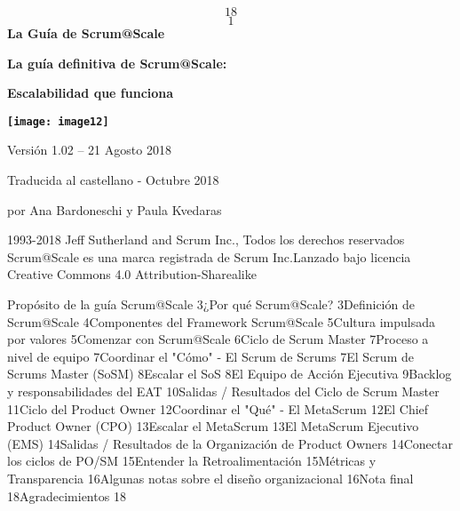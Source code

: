\documentclass{article} %
\begin{document}


\noindent 

\noindent 

\noindent 

\noindent 

\noindent 
\[18\] 
\[1\] 
\textbf{La Gu\'{i}a de Scrum@Scale{\circledR}}

\noindent \textbf{La gu\'{i}a definitiva de Scrum@Scale:}

\noindent \textbf{Escalabilidad que funciona}

\noindent \textbf{\texttt{[image: image12]}}

\noindent \textbf{}

\noindent Versi\'{o}n 1.02 -- 21 Agosto 2018

\noindent Traducida al castellano - Octubre 2018 

\noindent por Ana Bardoneschi y Paula Kvedaras

\noindent \textbf{}

\noindent {\copyright}1993-2018 Jeff Sutherland and Scrum Inc., Todos los derechos reservados Scrum@Scale es una marca registrada de Scrum Inc.Lanzado bajo licencia Creative Commons 4.0 Attribution-Sharealike

\noindent \eject 

\noindent 

\noindent Prop\'{o}sito de la gu\'{i}a Scrum@Scale 3¿Por qu\'{e} Scrum@Scale? 3Definici\'{o}n de Scrum@Scale 4Componentes del Framework Scrum@Scale{\circledR} 5Cultura impulsada por valores 5Comenzar con Scrum@Scale 6Ciclo de Scrum Master 7Proceso a nivel de equipo 7Coordinar el "C\'{o}mo" - El Scrum de Scrums 7El Scrum de Scrums Master (SoSM) 8Escalar el SoS 8El Equipo de Acci\'{o}n Ejecutiva 9Backlog y responsabilidades del EAT 10Salidas / Resultados del Ciclo de Scrum Master 11Ciclo del Product Owner 12Coordinar el "Qu\'{e}" -  El MetaScrum 12El Chief Product Owner (CPO) 13Escalar el MetaScrum 13El MetaScrum Ejecutivo (EMS) 14Salidas / Resultados de la Organizaci\'{o}n de Product Owners 14Conectar los ciclos de PO/SM 15Entender la Retroalimentaci\'{o}n 15M\'{e}tricas y Transparencia 16Algunas notas sobre el dise\~{n}o organizacional 16Nota final 18Agradecimientos 18

\noindent \textbf{}

\noindent \textbf{}

\noindent \eject \textbf{}
\end{document}

